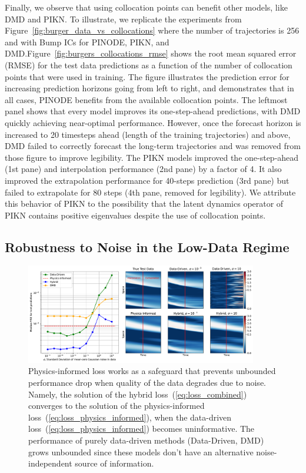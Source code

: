 Finally, we observe that using collocation points can benefit other models, like DMD and PIKN. To illustrate, we replicate the experiments from Figure~\ref{fig:burger_data_vs_collocations} where the number of trajectories is 256 and with Bump ICs for PINODE, PIKN, and DMD.Figure~\ref{fig:burgers_collocations_rmse} shows the root mean squared error (RMSE) for the test data predictions as a function of the number of collocation points that were used in training.  The figure illustrates the prediction error for increasing prediction horizons going from left to right, and demonstrates that in all cases, PINODE benefits from the available collocation points. The leftmost panel shows that every model improves its one-step-ahead predictions, with DMD quickly achieving near-optimal performance. However, once the forecast horizon is increased to 20 timesteps ahead (length of the training trajectories) and above, DMD failed to correctly forecast the long-term trajectories and was removed from those figure to improve legibility. The PIKN models improved the one-step-ahead (1st pane) and interpolation performance (2nd pane) by a factor of 4. It also improved the extrapolation performance for 40-steps prediction (3rd pane) but failed to extrapolate for 80 steps (4th pane, removed for legibility). We attribute this behavior of PIKN to the possibility that the latent dynamics operator of PIKN contains positive eigenvalues despite the use of collocation points.

\subsection{Robustness to Noise in the Low-Data Regime}
\label{sec:burger_noise}
\begin{figure}[t]
    \centering
    \includegraphics[width=0.9\textwidth]{figures/burgers_noise.pdf}
    \caption{Physics-informed loss works as a safeguard that prevents unbounded performance drop when quality of the data degrades due to noise. Namely, the solution of the hybrid loss~(\ref{eq:loss_combined}) converges to the solution of the physics-informed loss~(\ref{eq:loss_physics_informed}), when the data-driven loss~(\ref{eq:loss_physics_informed}) becomes uninformative. The performance of purely data-driven methods (Data-Driven, DMD) grows unbounded since these models don't have an alternative noise-independent source of information.}
    \label{fig:burger_noise}
\end{figure}

